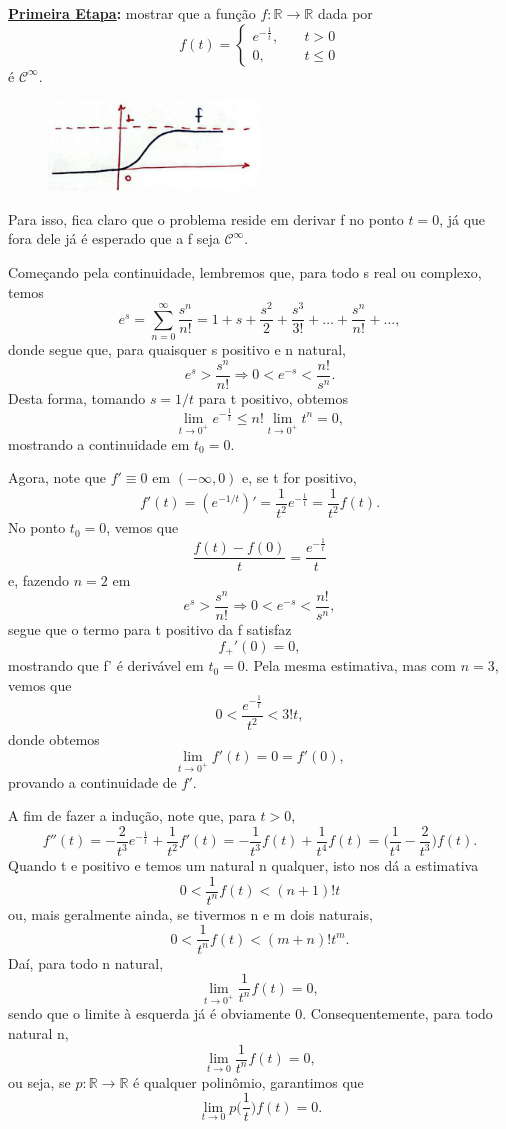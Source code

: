 \documentclass[../distribution_theory_notes.tex]{subfiles}
\begin{document}
\textbf{\underline{Primeira Etapa}:} mostrar que a função \(f:\mathbb{R}\rightarrow \mathbb{R}\) dada por
\[
	f(t) = \left\{\begin{array}{ll}
		e^{-\frac{1}{t}}, & \quad t> 0    \\
		0,                & \quad t\leq 0
	\end{array}\right.
\]
é \(\mathcal{C}^{\infty}\).
\begin{figure}[H]
	\begin{center}
		\includegraphics[height=0.5\textheight, width=0.5\textwidth, keepaspectratio]{./Images/plot_f_05.png}
	\end{center}
\end{figure}

Para isso, fica claro que o problema reside em derivar f no ponto \(t=0\), já que fora dele já é esperado que a f seja \(\mathcal{C}^{\infty}.\)

Começando pela continuidade, lembremos que, para todo s real ou complexo, temos
\[
	e^{s}=\sum\limits_{n=0}^{\infty}\frac{s^{n}}{n!} = 1+s+\frac{s^{2}}{2}+\frac{s^{3}}{3!}+\dotsc +\frac{s^{n}}{n!}+\dotsc ,
\]
donde segue que, para quaisquer s positivo e n natural,
\[
	e^{s}>\frac{s^{n}}{n!} \Rightarrow 0<e^{-s}<\frac{n!}{s^{n}}.
\]
Desta forma, tomando \(s=1/t\) para t positivo, obtemos
\[
	\lim_{t\to 0^{+}}e^{-\frac{1}{t}}\leq n!\lim_{t\to 0^{+}}t^{n}=0,
\]
mostrando a continuidade em \(t_{0}=0.\)

Agora, note que \(f'\equiv 0\) em \((-\infty, 0)\) e, se t for positivo,
\[
	f'(t)=(e^{-1/t})' = \frac{1}{t^{2}}e^{-\frac{1}{t}} = \frac{1}{t^{2}}f(t).
\]
No ponto \(t_{0}=0\), vemos que
\[
	\frac{f(t)-f(0)}{t} = \frac{e^{-\frac{1}{t}}}{t}
\]
e, fazendo \(n = 2\) em
\[
	e^{s}>\frac{s^{n}}{n!} \Rightarrow 0<e^{-s}<\frac{n!}{s^{n}},
\]
segue que o termo para t positivo da f satisfaz
\[
	f_{+}'(0)= 0,
\]
mostrando que f' é derivável em \(t_{0}= 0.\) Pela mesma estimativa, mas com \(n=3\), vemos que
\[
	0<\frac{e^{-\frac{1}{t}}}{t^{2}} < 3!t,
\]
donde obtemos
\[
	\lim_{t\to 0^{+}}f'(t)=0=f'(0),
\]
provando a continuidade de \(f'\).

A fim de fazer a indução, note que, para \(t > 0\),
\[
	f''(t)=-\frac{2}{t^{3}}e^{-\frac{1}{t}}+\frac{1}{t^{2}}f'(t)=-\frac{1}{t^{3}}f(t)+\frac{1}{t^{4}}f(t)=\biggl(\frac{1}{t^{4}}-\frac{2}{t^{3}}\biggr)f(t).
\]
Quando t e positivo e temos um natural n qualquer, isto nos dá a estimativa
\[
	0<\frac{1}{t^{n}}f(t)<(n+1)!t
\]
ou, mais geralmente ainda, se tivermos n e m dois naturais,
\[
	0<\frac{1}{t^{n}}f(t)<(m+n)!t^{m}.
\]
Daí, para todo n natural,
\[
	\lim_{t\to 0^{+}}\frac{1}{t^{n}}f(t)=0,
\]
sendo que o limite à esquerda já é obviamente 0. Consequentemente, para todo natural n,
\[
	\lim_{t\to 0}\frac{1}{t^{n}}f(t)=0,
\]
ou seja, se \(p:\mathbb{R}\rightarrow \mathbb{R}\) é qualquer polinômio, garantimos que
\[
	\lim_{t\to 0}p \biggl(\frac{1}{t}\biggr)f(t)=0.
\]
\end{document}
